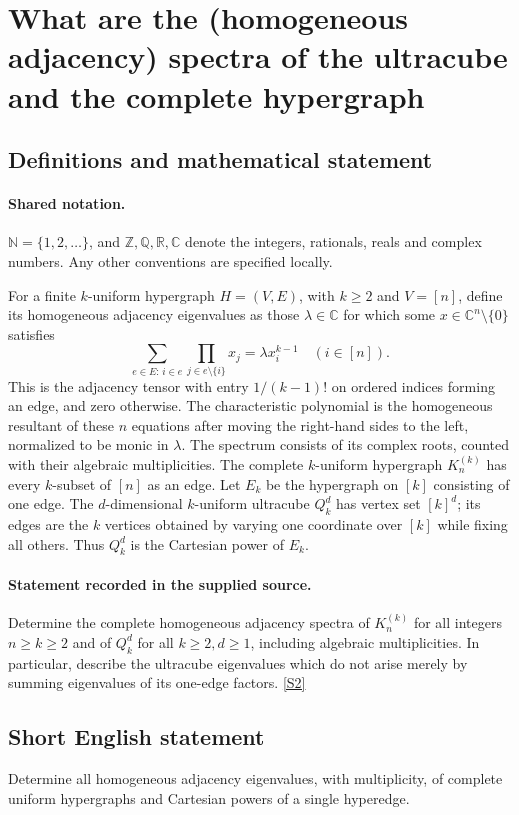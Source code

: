 \documentclass[11pt]{article}
\newcommand{\sref}[2]{\hyperlink{source:#1:#2}{[S#2]}}
\begin{document}
\section{What are the (homogeneous adjacency) spectra of the ultracube and the complete hypergraph}\label{statement}

\subsection{Definitions and mathematical statement}

\paragraph{Shared notation.}$\mathbb N=\{1,2,\ldots\}$, and $\mathbb Z,\mathbb Q,\mathbb R,\mathbb C$ denote the integers, rationals, reals and complex numbers. Any other conventions are specified locally.


For a finite $k$-uniform hypergraph $H=(V,E)$, with $k\geq2$ and $V=[n]$, define its homogeneous adjacency eigenvalues as those $\lambda\in\mathbb C$ for which some $x\in\mathbb C^n\setminus\{0\}$ satisfies
\[\sum_{e\in E:\,i\in e}\prod_{j\in e\setminus\{i\}}x_j=\lambda x_i^{k-1}\quad(i\in[n]).\]
This is the adjacency tensor with entry $1/(k-1)!$ on ordered indices forming an edge, and zero otherwise. The characteristic polynomial is the homogeneous resultant of these $n$ equations after moving the right-hand sides to the left, normalized to be monic in $\lambda$. The spectrum consists of its complex roots, counted with their algebraic multiplicities. The complete $k$-uniform hypergraph $K_n^{(k)}$ has every $k$-subset of $[n]$ as an edge. Let $E_k$ be the hypergraph on $[k]$ consisting of one edge. The $d$-dimensional $k$-uniform ultracube $Q_k^d$ has vertex set $[k]^d$; its edges are the $k$ vertices obtained by varying one coordinate over $[k]$ while fixing all others. Thus $Q_k^d$ is the Cartesian power of $E_k$.
\paragraph{Statement recorded in the supplied source.}
Determine the complete homogeneous adjacency spectra of $K_n^{(k)}$ for all integers $n\geq k\geq2$ and of $Q_k^d$ for all $k\geq2,d\geq1$, including algebraic multiplicities. In particular, describe the ultracube eigenvalues which do not arise merely by summing eigenvalues of its one-edge factors. \sref{statement}{2}
\subsection{Short English statement}
Determine all homogeneous adjacency eigenvalues, with multiplicity, of complete uniform hypergraphs and Cartesian powers of a single hyperedge.
\end{document}
